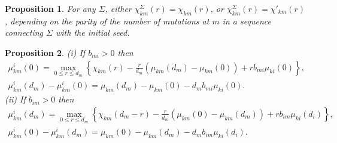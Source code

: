 \documentclass[10pt,a4paper]{amsart}
\newtheorem{proposition}{Proposition}
\begin{document}
\begin{proposition}\label{samefy}
For any $\Sigma$, either $\chi_{km}^\Sigma(r)=\chi_{km}(r)$, or $\chi_{km}^\Sigma(r)=\chi'_{km}(r)$, depending on the parity of the number of mutations at $m$ in a sequence connecting $\Sigma$ with the initial seed.
\end{proposition}

\begin{proposition}\label{newmu}
{\rm (i)} If $b_{mi}>0$ then
\begin{equation}\label{newmufrom}
\begin{gathered}
\mu_{km}^i(0)=\max_{0\le r\le d_m}\left\{\chi_{km}(r)-\frac r{d_m}\left(\mu_{km}(d_m)-\mu_{km}(0)\right)
+rb_{mi}\mu_{ki}(0)\right\},\\
\mu_{km}^i(d_m)-\mu_{km}^i(0)=\mu_{km}(d_m)-\mu_{km}(0)-d_mb_{mi}\mu_{ki}(0).
\end{gathered}
\end{equation}
{\rm (ii)} If $b_{im}>0$ then
\begin{equation}\label{newmutom}
\begin{gathered}
\mu_{km}^i(d_m)=\max_{0\le r\le d_m}\left\{\chi_{km}(d_m-r)-\frac r{d_m}\left(\mu_{km}(0)-\mu_{km}(d_m)\right)
+rb_{im}\mu_{ki}(d_i)\right\},\\
\mu_{km}^i(0)-\mu_{km}^i(d_m)=\mu_{km}(0)-\mu_{km}(d_m)-d_mb_{im}\mu_{ki}(d_i).
\end{gathered}
\end{equation}
\end{proposition}
\end{document}
